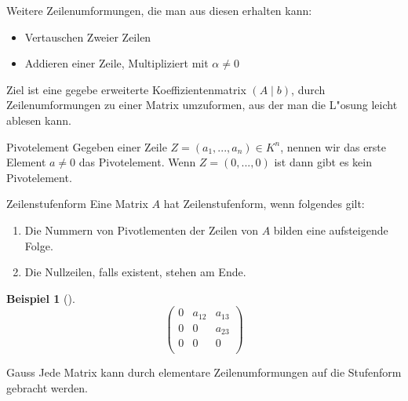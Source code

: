 \documentclass[11pt]{article}
\newtheorem{exa}{Beispiel}[section]
\begin{document}
Weitere Zeilenumformungen, die man aus diesen erhalten kann:
\begin{relation}
\begin{itemize}
\item Vertauschen Zweier Zeilen
\item Addieren einer Zeile, Multipliziert mit \(\alpha \not= 0\)
\end{itemize}
\end{relation}

Ziel ist eine gegebe erweiterte Koeffizientenmatrix \((A\mid b)\), durch
Zeilenumformungen zu einer Matrix umzuformen, aus der man die L"osung leicht
ablesen kann.

\begin{definition}{Pivotelement}{}
Gegeben einer Zeile \(Z=(a_1,...,a_n)\in K^n\), nennen wir das erste Element
\(a\not= 0\) das Pivotelement.
Wenn \(Z=(0,...,0)\) ist dann gibt es kein Pivotelement.
\end{definition}

\begin{definition}{Zeilenstufenform}{}
Eine Matrix \(A\) hat Zeilenstufenform, wenn folgendes gilt:
\begin{enumerate}
\item Die Nummern von Pivotlementen der Zeilen von \(A\) bilden eine aufsteigende
Folge.
\item Die Nullzeilen, falls existent, stehen am Ende.
\end{enumerate}
\end{definition}

\begin{exa}[] \label{} \
\[
\begin{pmatrix}
 0 & a_{12} & a_{13} \\
 0 & 0 & a_{23} \\
 0 & 0 & 0 \\
\end{pmatrix}
\]
\end{exa}

\begin{theo}{Gauss}{}
Jede Matrix kann durch elementare Zeilenumformungen auf die Stufenform gebracht
werden.
\end{theo}
\end{document}
